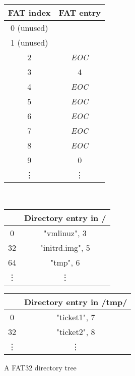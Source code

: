 \documentclass[submission,copyright,creativecommons]{eptcs}
\begin{document}
\begin{figure}
  \centering
  \caption{A FAT32 directory tree}
  \label{fat32-example}

  \begin{tabular}{|c|c|}
    \hline
    FAT index & FAT entry \\ \hline
    0 (unused) &  \\ \hline
    1 (unused) &  \\ \hline
    2 & \textit{EOC} \\ \hline
    3 & 4 \\ \hline
    4 & \textit{EOC} \\ \hline
    5 & \textit{EOC} \\ \hline
    6 & \textit{EOC} \\ \hline
    7 & \textit{EOC} \\ \hline
    8 & \textit{EOC} \\ \hline
    9 & 0 \\ \hline
    \vdots & \vdots
  \end{tabular}\\

  \begin{tabular}{|c|c|}
    \hline
       & Directory entry in / \\ \hline
    0  & "vmlinuz", 3 \\ \hline
    32 & "initrd.img", 5 \\ \hline
    64 & "tmp", 6 \\ \hline
    \vdots & \vdots
  \end{tabular}

  \begin{tabular}{|c|c|}
    \hline
       & Directory entry in /tmp/ \\ \hline
    0  & "ticket1", 7 \\ \hline
    32 & "ticket2", 8 \\ \hline
    \vdots & \vdots
  \end{tabular}
\end{figure}

\end{document}
